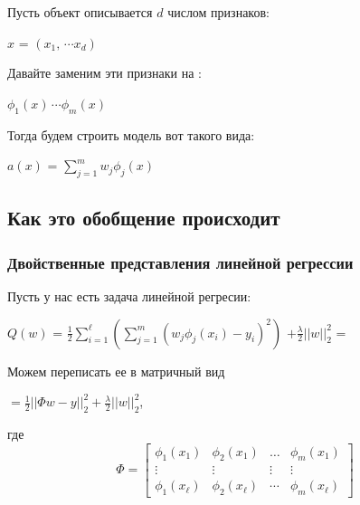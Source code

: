         Пусть объект описывается $d$ числом признаков: 
        \begin{center}
        \large
            $x$ = $(x_1, \, \cdots x_d)$
        \end{center}

        Давайте заменим эти признаки на :
        \begin{center}
        \large
            $\phi_1(x) \, \cdots \phi_m(x)$
        \end{center}

        Тогда будем строить модель вот такого вида:
        \begin{center}
            \large
            $a(x)$ = $\sum\limits_{j = 1}^m w_j\phi_j(x)$
        \end{center}


        \subsection{Как это обобщение происходит}

            \subsubsection{Двойственные представления линейной регрессии}

            Пусть у нас есть задача линейной регресии:

            \begin{center}
                \Large
                $Q(w)$ = $\frac{1}{2}\sum\limits_{i = 1}^\ell(\sum\limits_{j = 1}^m(w_j\phi_j(x_i) - y_i)^2)$ $+ \frac{\lambda}{2}||w||^2_2$ =
            \end{center}
            Можем переписать ее в матричный вид
            \begin{center}
                \Large
                $= \frac{1}{2}||\Phi w - y||_2^2 + \frac{\lambda}{2}||w||_2^2$,
            \end{center}

            где \[
            \Phi = \begin{bmatrix}
            \phi_1(x_1) & \phi_2(x_1) & \ldots & \phi_m(x_1)\\
            \vdots & \vdots & \vdots & \vdots \\
            \phi_1(x_\ell) & \phi_2(x_\ell) & \cdots & \phi_m(x_\ell)
            \end{bmatrix}
            \]

